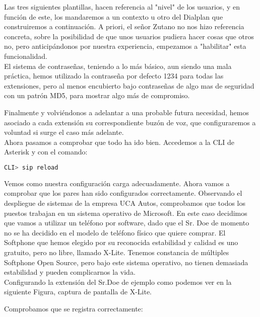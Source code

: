Las tres siguientes plantillas, hacen referencia al "nivel" de los usuarios, y en función de este, los mandaremos a un contexto u otro del Dialplan que construiremos a continuación. A priori, el señor Zutano no nos hizo referencia concreta, sobre la posibilidad de que unos usuarios pudiera hacer cosas que otros no, pero anticipándonos por nuestra experiencia, empezamos a "habilitar" esta funcionalidad.\\

El sistema de contraseñas, teniendo a lo más básico, aun siendo una mala práctica, hemos utilizado la contraseña por defecto 1234 para todas las extensiones, pero al menos encubierto bajo contraseñas de algo mas de seguridad con un patrón MD5, para mostrar algo más de compromiso.

Finalmente y volviéndonos a adelantar a una probable futura necesidad, hemos asociado a cada extensión su correspondiente buzón de voz, que configuraremos a voluntad si surge el caso más adelante.\\

Ahora pasamos a comprobar que todo ha ido bien. Accedemos a la CLI de Asterisk y con el comando:

\begin{lstlisting}[language=sh]
CLI> sip reload
\end{lstlisting}

Vemos como nuestra configuración carga adecuadamente. Ahora vamos a comprobar que los pares han sido configurados correctamente. Observando el despliegue de sistemas de la empresa UCA Autos, comprobamos que todos los puestos trabajan en un sistema operativo de Microsoft. En este caso decidimos que vamos a utilizar un teléfono por software, dado que el Sr. Doe de momento no se ha decidido en el modelo de teléfono físico que quiere comprar. El Softphone que hemos elegido por su reconocida estabilidad y calidad es uno gratuito, pero no libre, llamado X-Lite. Tenemos constancia de múltiples Softphone Open Source, pero bajo este sistema operativo, no tienen demasiada estabilidad y pueden complicarnos la vida.\\

Configurando la extensión del Sr.Doe de ejemplo como podemos ver en la siguiente Figura, captura de pantalla de X-Lite.\\


Comprobamos que se registra correctamente:

